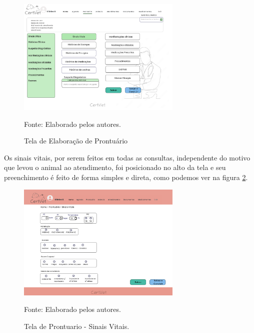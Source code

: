 \documentclass[
    12pt,               %
    openright,          %
    oneside,
    a4paper,            %
    BIBLATEX,           %
    TODO,               %
    english,            %
    brazil              %
    ]{ifsp-spo-inf-ctds}
\begin{document}
\begin{figure}[H]
                \centering
                \caption{Tela de Elaboração de Prontuário}
                \includegraphics[width=0.7\textwidth]{images/Telas/Prontuario WF.png}
                
                \label{fig:ProntuarioWF}
                \centering
        {\footnotesize Fonte: Elaborado pelos autores.}
            \end{figure}    

Os sinais vitais, por serem feitos em todas as consultas, independente do motivo que levou o animal ao atendimento, foi posicionado no alto da tela e seu preenchimento é feito de forma simples e direta, como podemos ver na figura \ref{fig:SinaisVitais}.

\begin{figure}[H]
                \centering
                \caption{Tela de Prontuario - Sinais Vitais.}
                \includegraphics[width=0.7\textwidth]{images/Telas/Sinais Vitais.png}
                
                \label{fig:SinaisVitais}
                \centering
        {\footnotesize Fonte: Elaborado pelos autores.}
            \end{figure}    
\end{document}
